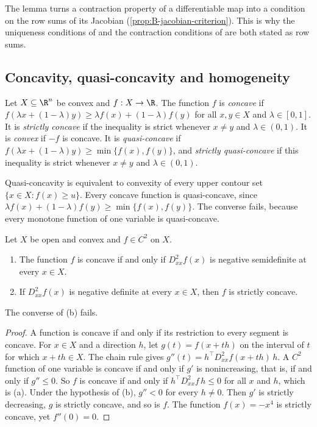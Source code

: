 The lemma turns a contraction property of a differentiable map into a condition on the row sums of its Jacobian
(\cref{prop:B-jacobian-criterion}). This is why the uniqueness conditions of \citet{Berry1994} and the contraction
conditions of \citet{BerryLevinsohnPakes1995} are both stated as row sums.

\subsection{Concavity, quasi-concavity and homogeneity}\label{sec:B-concavity}

\begin{definition}\label{def:B-concave}
Let $X \subseteq \R^n$ be convex and $f : X \to \R$. The function $f$ is \emph{concave} if
$f(\lambda x + (1 - \lambda)y) \geq \lambda f(x) + (1 - \lambda)f(y)$ for all $x, y \in X$ and $\lambda \in [0, 1]$.
It is \emph{strictly concave} if the inequality is strict whenever $x \neq y$ and $\lambda \in (0, 1)$. It is
\emph{convex} if $-f$ is concave. It is \emph{quasi-concave} if
$f(\lambda x + (1 - \lambda)y) \geq \min\{f(x), f(y)\}$, and \emph{strictly quasi-concave} if this inequality is
strict whenever $x \neq y$ and $\lambda \in (0, 1)$.
\end{definition}

Quasi-concavity is equivalent to convexity of every upper contour set $\{x \in X : f(x) \geq u\}$. Every concave
function is quasi-concave, since $\lambda f(x) + (1 - \lambda)f(y) \geq \min\{f(x), f(y)\}$. The converse fails, because
every monotone function of one variable is quasi-concave.

\begin{proposition}\label{prop:B-concave-hessian}
Let $X$ be open and convex and $f \in C^2$ on $X$.
\begin{enumerate}[label=(\alph*)]
  \item The function $f$ is concave if and only if $D^2_{xx}f(x)$ is negative semidefinite at every $x \in X$.
  \item If $D^2_{xx}f(x)$ is negative definite at every $x \in X$, then $f$ is strictly concave.
\end{enumerate}
The converse of (b) fails.
\end{proposition}

\begin{proof}
A function is concave if and only if its restriction to every segment is concave. For $x \in X$ and a direction
$h$, let $g(t) = f(x + th)$ on the interval of $t$ for which $x + th \in X$. The chain rule gives
$g''(t) = h^\top D^2_{xx}f(x + th)\,h$. A $C^2$ function of one variable is concave if and only if $g' $ is
nonincreasing, that is, if and only if $g'' \leq 0$. So $f$ is concave if and only if $h^\top D^2_{xx}f\,h \leq 0$ for all
$x$ and $h$, which is (a). Under the hypothesis of (b), $g'' < 0$ for every $h \neq 0$. Then $g'$ is strictly
decreasing, $g$ is strictly concave, and so is $f$. The function $f(x) = -x^4$ is strictly concave, yet
$f''(0) = 0$.
\end{proof}

